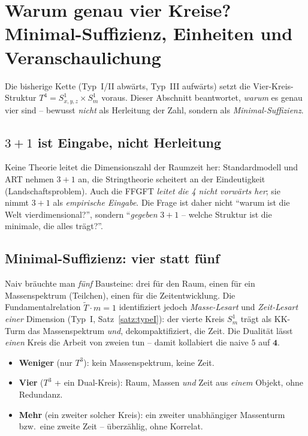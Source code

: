 \section{Warum genau vier Kreise? Minimal-Suffizienz, Einheiten und Veranschaulichung}\label{sec:warumvier}

Die bisherige Kette (Typ~I/II abw\"arts, Typ~III aufw\"arts) setzt die
Vier-Kreis-Struktur $T^4 = S^1_{x,y,z}\times S^1_m$ voraus. Dieser Abschnitt
beantwortet, \emph{warum} es genau vier sind -- bewusst \emph{nicht} als
Herleitung der Zahl, sondern als \emph{Minimal-Suffizienz}.

\subsection{$3+1$ ist Eingabe, nicht Herleitung}

Keine Theorie leitet die Dimensionszahl der Raumzeit her: Standardmodell und ART
nehmen $3+1$ an, die Stringtheorie scheitert an der Eindeutigkeit
(Landschaftsproblem). Auch die FFGFT \emph{leitet die 4 nicht vorw\"arts her};
sie nimmt $3+1$ als \emph{empirische Eingabe}. Die Frage ist daher nicht
\enquote{warum ist die Welt vierdimensional?}, sondern \enquote{\emph{gegeben}
$3+1$ -- welche Struktur ist die minimale, die alles tr\"agt?}.

\subsection{Minimal-Suffizienz: vier statt f\"unf}

\begin{important}
Naiv br\"auchte man \emph{f\"unf} Bausteine: drei f\"ur den Raum, einen f\"ur ein
Massenspektrum (Teilchen), einen f\"ur die Zeitentwicklung. Die Fundamentalrelation
$\tilde T\cdot m = 1$ identifiziert jedoch \emph{Masse-Lesart} und
\emph{Zeit-Lesart} \emph{einer} Dimension (Typ~I, Satz~\ref{satz:typeI}): der
vierte Kreis $S^1_m$ tr\"agt als KK-Turm das Massenspektrum \emph{und},
dekompaktifiziert, die Zeit. Die Dualit\"at l\"asst \emph{einen} Kreis die Arbeit
von zweien tun -- damit kollabiert die naive $5$ auf $\mathbf{4}$.
\end{important}

\begin{itemize}
  \item \textbf{Weniger} (nur $T^3$): kein Massenspektrum, keine Zeit.
  \item \textbf{Vier} ($T^3$ + ein Dual-Kreis): Raum, Massen \emph{und} Zeit aus
  \emph{einem} Objekt, ohne Redundanz.
  \item \textbf{Mehr} (ein zweiter solcher Kreis): ein zweiter unabh\"angiger
  Massenturm bzw.\ eine zweite Zeit -- \"uberz\"ahlig, ohne Korrelat.
\end{itemize}


